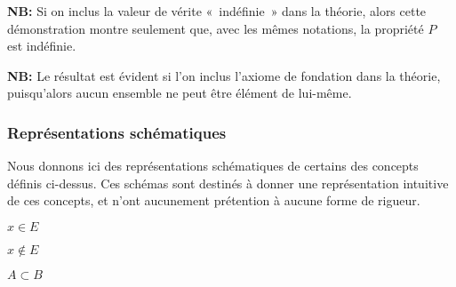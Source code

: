 \hfill\square

\medskip

\noindent\textbf{NB:} Si on inclus la valeur de vérite « indéfinie » dans la théorie, alors cette démonstration montre seulement que, avec les mêmes notations, la propriété $P$ est indéfinie.

\medskip

\noindent\textbf{NB:} Le résultat est évident si l'on inclus l'axiome de fondation dans la théorie, puisqu'alors aucun ensemble ne peut être élément de lui-même.


\subsubsection{Représentations schématiques}

Nous donnons ici des représentations schématiques de certains des concepts définis ci-dessus. 
Ces schémas sont destinés à donner une représentation intuitive de ces concepts, et n'ont aucunement prétention à aucune forme de rigueur.

\bigskip
\bigskip

\begin{minipage}{\linewidth}
\centering
{}

$x \in E$
\end{minipage}

\bigskip
\bigskip

\begin{minipage}{\linewidth}
\centering
{}

$x \notin E$
\end{minipage}

\bigskip
\bigskip

\begin{minipage}{\linewidth}
\centering
{}

$A \subset B$
\end{minipage}

